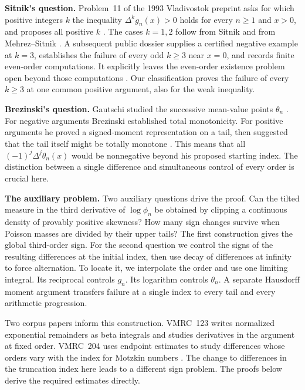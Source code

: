 \documentclass[11pt,a4paper]{article}
\begin{document}
\textbf{Sitnik's question.}
Problem~11 of the 1993 Vladivostok preprint asks for which positive integers $k$ the inequality $\Delta^k g_n(x)>0$ holds for every $n\ge1$ and $x>0$, and proposes all positive $k$ \cite[pp.~27--28]{sitnik}. The cases $k=1,2$ follow from Sitnik and from Mehrez--Sitnik \cite{mehrez}. A subsequent public dossier supplies a certified negative example at $k=3$, establishes the failure of every odd $k\ge3$ near $x=0$, and records finite even-order computations. It explicitly leaves the even-order existence problem open beyond those computations \cite{tru}. Our classification proves the failure of every $k\ge3$ at one common positive argument, also for the weak inequality.

\textbf{Brezinski's question.}
Gautschi studied the successive mean-value points $\theta_n$ \cite{gautschi}. For negative arguments Brezinski established total monotonicity. For positive arguments he proved a signed-moment representation on a tail, then suggested that the tail itself might be totally monotone \cite[p.~88]{brezinski}. This means that all $(-1)^j\Delta^j\theta_n(x)$ would be nonnegative beyond his proposed starting index. The distinction between a single difference and simultaneous control of every order is crucial here.

\textbf{The auxiliary problem.}
Two auxiliary questions drive the proof. Can the tilted measure in the third derivative of $\log\phi_n$ be obtained by clipping a continuous density of provably positive skewness? How many sign changes survive when Poisson masses are divided by their upper tails? The first construction gives the global third-order sign. For the second question we control the signs of the resulting differences at the initial index, then use decay of differences at infinity to force alternation. To locate it, we interpolate the order and use one limiting integral. Its reciprocal controls $g_n$. Its logarithm controls $\theta_n$. A separate Hausdorff moment argument transfers failure at a single index to every tail and every arithmetic progression.

Two corpus papers inform this construction. VMRC~123 writes normalized exponential remainders as beta integrals and studies derivatives in the argument at fixed order. VMRC~204 uses endpoint estimates to study differences whose orders vary with the index for Motzkin numbers \cite{vmrc}. The change to differences in the truncation index here leads to a different sign problem. The proofs below derive the required estimates directly.
\end{document}
